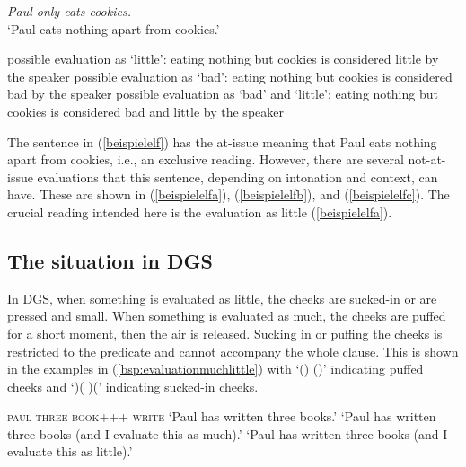 \begin{exe} 
\ex \textit{Paul only eats cookies.} \\ `Paul eats nothing apart from cookies.' \label{beispielelf} 
\begin{xlist} 
\ex possible evaluation as `little': eating nothing but cookies is considered little by the speaker\label{beispielelfa}
\ex possible evaluation as `bad': eating nothing but cookies is considered bad by the speaker \label{beispielelfb} 
\ex possible evaluation as `bad' and `little': eating nothing but cookies is considered bad and little by the speaker \label{beispielelfc} 
\end{xlist} 
\end{exe}

\noindent The sentence in (\ref{beispielelf}) has the at-issue meaning that Paul eats nothing apart from cookies, i.e., an exclusive reading. However, there are several not-at-issue evaluations that this sentence, depending on intonation and context, can have. These are shown in (\ref{beispielelfa}), (\ref{beispielelfb}), and (\ref{beispielelfc}). The crucial reading intended here is the evaluation as little (\ref{beispielelfa}).

\subsection{The situation in DGS}
In DGS, when something is evaluated as little, the cheeks are sucked-in or are pressed and small. When something is evaluated as much, the cheeks are puffed for a short moment, then the air is released. Sucking in or puffing the cheeks is restricted to the predicate and cannot accompany the whole clause. This is shown in the examples in (\ref{bsp:evaluationmuchlittle}) with `() ()' indicating puffed cheeks and `)( )(' indicating sucked-in cheeks.

\begin{exe}
\ex\label{bsp:evaluationmuchlittle}\begin{xlist}
\ex 
{\textsc{paul three book+++ write}}   
\glt `Paul has written three books.'\label{bsp:evaluationmuchlittlea}
\ex {} 
\glt `Paul has written three books (and I evaluate this as much).'\label{bsp:evaluationmuchlittleb}
\ex {} 
\glt `Paul has written three books (and I evaluate this as little).'\label{bsp:evaluationmuchlittlec}
\end{xlist}
\end{exe} 


